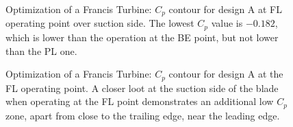 \begin{figure}[h!]
\begin{minipage}[b]{1\linewidth}
 \centering
\end{minipage}
\caption{Optimization of a Francis Turbine: $C_p$ contour for design A at FL operating point over suction side. The lowest  $C_p$ value is $-0.182$, which is lower than the operation at the BE point, but not lower than the PL one.}
\label{Francis-A-FL}
\end{figure}


\begin{figure}[h!]
\begin{minipage}[b]{1\linewidth}
 \centering
\end{minipage}
\caption{Optimization of a Francis Turbine: $C_p$ contour for design A at the FL operating point. A closer loot at the suction side of the blade when operating at the FL point demonstrates an additional low $C_p$ zone, apart from close to the trailing edge, near the leading edge. }
\label{Francis-A-SS}
\end{figure}

